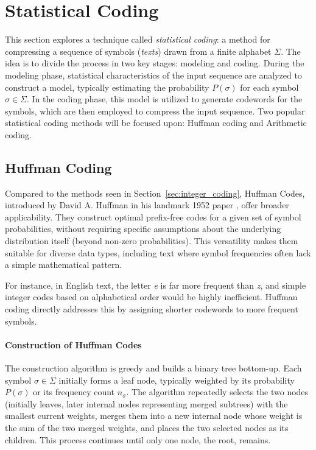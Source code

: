 \section{Statistical Coding} \label{sec:statistical_coding}

This section explores a technique called \emph{statistical coding}: a method for compressing a sequence of symbols (\emph{texts}) drawn from a finite alphabet $\Sigma$. The idea is to divide the process in two key stages: modeling and coding. During the modeling phase, statistical characteristics of the input sequence are analyzed to construct a model, typically estimating the probability $P(\sigma)$ for each symbol $\sigma \in \Sigma$. In the coding phase, this model is utilized to generate codewords for the symbols, which are then employed to compress the input sequence. Two popular statistical coding methods will be focused upon: Huffman coding and Arithmetic coding.

\subsection{Huffman Coding} \label{subsec:huffman_coding}

Compared to the methods seen in Section~\ref{sec:integer_coding}, Huffman Codes, introduced by David A. Huffman in his landmark 1952 paper \cite{Huffman1952}, offer broader applicability. They construct optimal prefix-free codes for a given set of symbol probabilities, without requiring specific assumptions about the underlying distribution itself (beyond non-zero probabilities). This versatility makes them suitable for diverse data types, including text where symbol frequencies often lack a simple mathematical pattern.

For instance, in English text, the letter \emph{e} is far more frequent than \emph{z}, and simple integer codes based on alphabetical order would be highly inefficient. Huffman coding directly addresses this by assigning shorter codewords to more frequent symbols.

\paragraph{Construction of Huffman Codes} The construction algorithm is greedy and builds a binary tree bottom-up. Each symbol $\sigma \in \Sigma$ initially forms a leaf node, typically weighted by its probability $P(\sigma)$ or its frequency count $n_\sigma$. The algorithm repeatedly selects the two nodes (initially leaves, later internal nodes representing merged subtrees) with the smallest current weights, merges them into a new internal node whose weight is the sum of the two merged weights, and places the two selected nodes as its children. This process continues until only one node, the root, remains.

